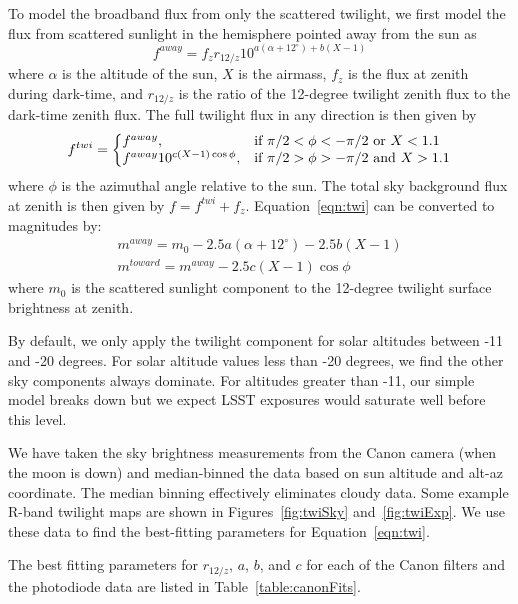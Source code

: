 \documentclass{emulateapj}  %
\begin{document}
To model the broadband flux from only the scattered twilight, we first model the flux from scattered sunlight in the hemisphere pointed away from the sun as
\begin{equation}\label{eqn:twi1}
  f^{away} = f_{z} r_{12/z} 10^{a(\alpha+12^{\circ})+b(X-1)}
\end{equation}
where $\alpha$ is the altitude of the sun, $X$ is the airmass, $f_{z}$ is the flux at zenith during dark-time, and $r_{12/z}$ is the ratio of the 12-degree twilight zenith flux to the dark-time zenith flux. The full twilight flux in any direction is then given by
\begin{equation}
  \label{eqn:twi}
  f^{twi}  = \left\{
  \begin{array}{@{}ll@{}}
        f^{away}, & \text{if}\  \pi/2 < \phi < -\pi/2  \text{ or } X < 1.1\\
        f^{away} 10^{c (X-1) \cos{\phi}}, &  \text{if}\   \pi/2 > \phi >  -\pi/2 \text{ and } X > 1.1
        \end{array} \right.
\end{equation}
where $\phi$ is the azimuthal angle relative to the sun. The total sky background flux at zenith is then given by $f = f^{twi} + f_{z}$. Equation~\ref{eqn:twi} can be converted to magnitudes by:
\begin{eqnarray}
  m^{away} = m_0 -2.5a(\alpha+12^{\circ})-2.5b(X-1) \\
  m^{toward} = m^{away} -2.5c(X-1)\cos{\phi}
\end{eqnarray}
where $m_0$ is the scattered sunlight component to the 12-degree twilight surface brightness at zenith.  

By default, we only apply the twilight component for solar altitudes between -11 and -20 degrees. For solar altitude values less than -20 degrees, we find the other sky components always dominate. For altitudes greater than -11, our simple model breaks down but we expect LSST exposures would saturate well before this level.  

We have taken the sky brightness measurements from the Canon camera (when the moon is down) and median-binned the data based on sun altitude and alt-az coordinate.  The median binning effectively eliminates cloudy data.  Some example R-band twilight maps are shown in Figures~\ref{fig:twiSky} and~\ref{fig:twiExp}.  We use these data to find the best-fitting parameters for Equation~\ref{eqn:twi}.  

The best fitting parameters for $r_{12/z}$, $a$, $b$, and $c$ for each of the Canon filters and the photodiode data are listed in Table~\ref{table:canonFits}.
\end{document}
